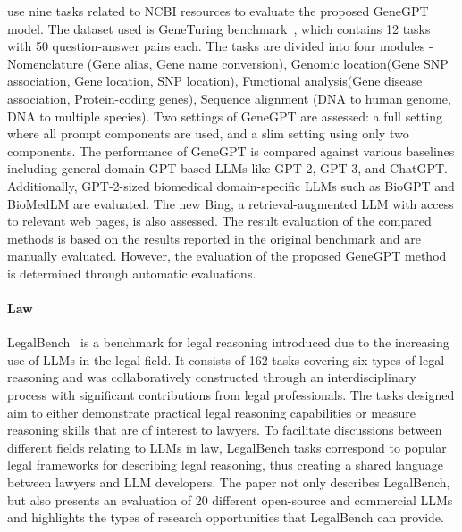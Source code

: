 \citet{jin2023genegpt} use nine tasks related to NCBI resources to evaluate the proposed GeneGPT model. The dataset used is GeneTuring benchmark~\cite{Hou2023GeneTuring}, which contains 12 tasks with 50 question-answer pairs each. The tasks are divided into four modules - Nomenclature  (Gene alias, Gene name conversion),  Genomic location(Gene SNP association, Gene location, SNP location), 
  Functional analysis(Gene disease association, Protein-coding genes), 
  Sequence alignment (DNA to human genome, DNA to multiple species). Two settings of GeneGPT are assessed: a full setting where all prompt components are used, and a slim setting using only two components. The performance of GeneGPT is compared against various baselines including general-domain GPT-based LLMs like GPT-2, GPT-3, and ChatGPT. Additionally, GPT-2-sized biomedical domain-specific LLMs such as BioGPT and BioMedLM are evaluated. The new Bing, a retrieval-augmented LLM with access to relevant web pages, is also assessed. The result evaluation of the compared methods is based on the results reported in the original benchmark and are manually evaluated. However, the evaluation of the proposed GeneGPT method is determined through automatic evaluations.





\paragraph{Law}
LegalBench~\citep{guha2023legalbench} is a benchmark for legal reasoning introduced due to the increasing use of LLMs in the legal field. It consists of 162 tasks covering six types of legal reasoning and was collaboratively constructed through an interdisciplinary process with significant contributions from legal professionals. The tasks designed aim to either demonstrate practical legal reasoning capabilities or measure reasoning skills that are of interest to lawyers. To facilitate discussions between different fields relating to LLMs in law, LegalBench tasks correspond to popular legal frameworks for describing legal reasoning, thus creating a shared language between lawyers and LLM developers. The paper not only describes LegalBench, but also presents an evaluation of 20 different open-source and commercial LLMs and highlights the types of research opportunities that LegalBench can provide.

